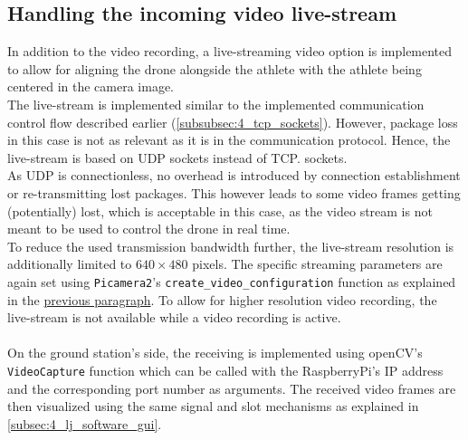 \subsection{Handling the incoming video live-stream}\label{subsubsec:4_live_stream}
In addition to the video recording, a live-streaming video option is
implemented to allow for aligning the drone alongside the athlete with the
athlete being centered in the camera image.\\
The live-stream is implemented similar to the implemented communication
control flow described earlier (\autoref{subsubsec:4_tcp_sockets}).
However, package loss in this case is not as relevant as it is in the
communication protocol.
Hence, the live-stream is based on \ac{UDP} sockets instead of \ac{TCP}.
sockets.\\
As \ac{UDP} is connectionless, no overhead is introduced by connection
establishment or re-transmitting lost packages.
This however leads to some video frames getting (potentially) lost, which is
acceptable in this case, as the video stream is not meant to be used to
control the drone in real time.\\
To reduce the used transmission bandwidth further, the live-stream resolution
is additionally limited to $640 \times 480$ pixels.
The specific streaming parameters are again set using \texttt{Picamera2}'s
\texttt{create\_video\_configuration} function as explained in the
\hyperref[subsubsec:4_cam_setup_recording]{previous paragraph}.
To allow for higher resolution video recording, the live-stream is not
available while a video recording is active.\\\\
\noindent On the ground station's side, the receiving is implemented using
openCV's \texttt{VideoCapture} function which can be called with the
RaspberryPi's IP address and the corresponding port number as arguments.
The received video frames are then visualized using the same signal and slot
mechanisms as explained in \autoref{subsec:4_lj_software_gui}.